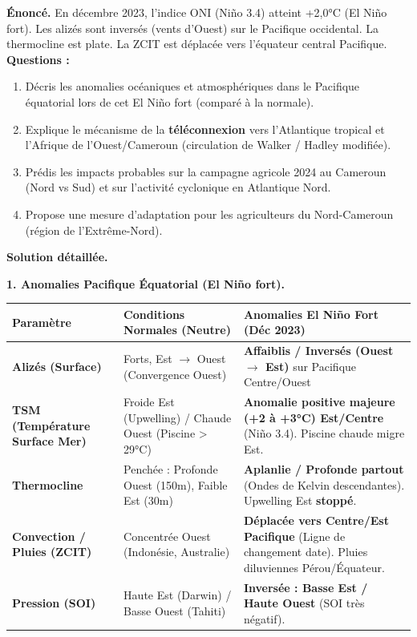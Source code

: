 \documentclass[11pt]{article}
\begin{document}
\begin{exoresolu}
\textbf{Énoncé.} En décembre 2023, l'indice ONI (Niño 3.4) atteint +2,0°C (El Niño fort). Les alizés sont inversés (vents d'Ouest) sur le Pacifique occidental. La thermocline est plate. La ZCIT est déplacée vers l'équateur central Pacifique.
\textbf{Questions :}
\begin{enumerate}
    \item Décris les anomalies océaniques et atmosphériques dans le Pacifique équatorial lors de cet El Niño fort (comparé à la normale).
    \item Explique le mécanisme de la \textbf{téléconnexion} vers l'Atlantique tropical et l'Afrique de l'Ouest/Cameroun (circulation de Walker / Hadley modifiée).
    \item Prédis les impacts probables sur la campagne agricole 2024 au Cameroun (Nord vs Sud) et sur l'activité cyclonique en Atlantique Nord.
    \item Propose une mesure d'adaptation pour les agriculteurs du Nord-Cameroun (région de l'Extrême-Nord).
\end{enumerate}

\tcblower
\textbf{Solution détaillée.}

\textbf{1. Anomalies Pacifique Équatorial (El Niño fort).}
\begin{center}
\begin{tabularx}{\linewidth}{|l|X|X|}\hline
\textbf{Paramètre} & \textbf{Conditions Normales (Neutre)} & \textbf{Anomalies El Niño Fort (Déc 2023)} \\ \hline
\textbf{Alizés (Surface)} & Forts, Est $\to$ Ouest (Convergence Ouest) & \textbf{Affaiblis / Inversés (Ouest $\to$ Est)} sur Pacifique Centre/Ouest \\ \hline
\textbf{TSM (Température Surface Mer)} & Froide Est (Upwelling) / Chaude Ouest (Piscine > 29°C) & \textbf{Anomalie positive majeure (+2 à +3°C) Est/Centre} (Niño 3.4). Piscine chaude migre Est. \\ \hline
\textbf{Thermocline} & Penchée : Profonde Ouest (150m), Faible Est (30m) & \textbf{Aplanlie / Profonde partout} (Ondes de Kelvin descendantes). Upwelling Est \textbf{stoppé}. \\ \hline
\textbf{Convection / Pluies (ZCIT)} & Concentrée Ouest (Indonésie, Australie) & \textbf{Déplacée vers Centre/Est Pacifique} (Ligne de changement date). Pluies diluviennes Pérou/Équateur. \\ \hline
\textbf{Pression (SOI)} & Haute Est (Darwin) / Basse Ouest (Tahiti) & \textbf{Inversée : Basse Est / Haute Ouest} (SOI très négatif). \\ \hline
\end{tabularx}
\end{center}


\end{exoresolu}
\end{document}
